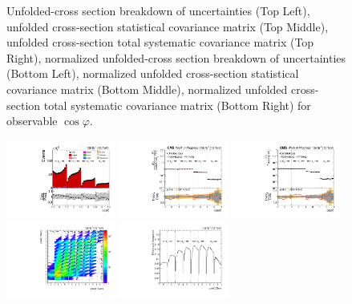 \begin{refsection}
\begin{figure}[htb]
\begin{center}
\caption{Unfolded-cross section breakdown of uncertainties (Top Left), unfolded cross-section statistical covariance matrix (Top Middle), unfolded cross-section total systematic covariance matrix (Top Right), normalized unfolded-cross section breakdown of uncertainties (Bottom Left), normalized unfolded cross-section statistical covariance matrix (Bottom Middle), normalized unfolded cross-section total systematic covariance matrix (Bottom Right) for  observable $\cos\varphi$.}
\label{fig:ll_cHel_uncertainties}
\end{center}
\end{figure}
\clearpage
\begin{figure}[htb]
\begin{center}
 \includegraphics[width=0.32\textwidth]{fig_fullRun2UL/controlplots/combined/Hyp_AntiLeptonBk_vs_TTBarMass.pdf}
 \includegraphics[width=0.32\textwidth]{fig_fullRun2UL/unfolding/combined/UnfoldedResults_b1k_mttbar.pdf}
 \includegraphics[width=0.32\textwidth]{fig_fullRun2UL/unfolding/combined/UnfoldedResultsNorm_b1k_mttbar.pdf} \\
 \includegraphics[width=0.32\textwidth]{fig_fullRun2UL/unfolding/combined/ResponseMatrix_b1k_mttbar.pdf}
 \includegraphics[width=0.32\textwidth]{fig_fullRun2UL/unfolding/combined/TotEff_b1k_mttbar.pdf}

\end{center}
\end{figure}
\end{refsection}
